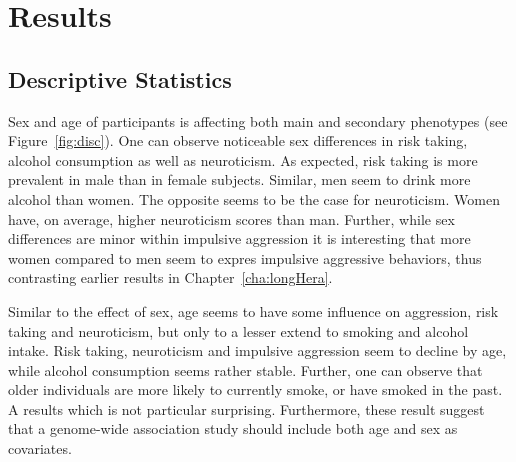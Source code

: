 \section{Results}
\label{sec:results_ukb_assoc}

\subsection{Descriptive Statistics}
\label{sub:descriptive_statistics}

Sex and age of participants is affecting both main and secondary phenotypes (see Figure~\ref{fig:disc}).
One can observe noticeable sex differences in risk taking, alcohol consumption as well as neuroticism.
As expected, risk taking is more prevalent in male than in female subjects. 
Similar, men seem to drink more alcohol than women.
The opposite seems to be the case for neuroticism.
Women have, on average, higher neuroticism scores than man.
Further,  while sex differences are minor within impulsive aggression it is interesting that more women compared to men seem to expres impulsive aggressive behaviors, thus contrasting earlier results in Chapter~\ref{cha:longHera}. 

Similar to the effect of sex, age seems to have some influence on aggression, risk taking and neuroticism, but only to a lesser extend to smoking and alcohol intake.
Risk taking, neuroticism and impulsive aggression seem to decline by age, while alcohol consumption seems rather stable.
Further, one can observe that older individuals are more likely to currently smoke, or have smoked in the past.
A results which is not particular surprising.
Furthermore, these result suggest that a genome-wide association study should include both age and sex as covariates.

